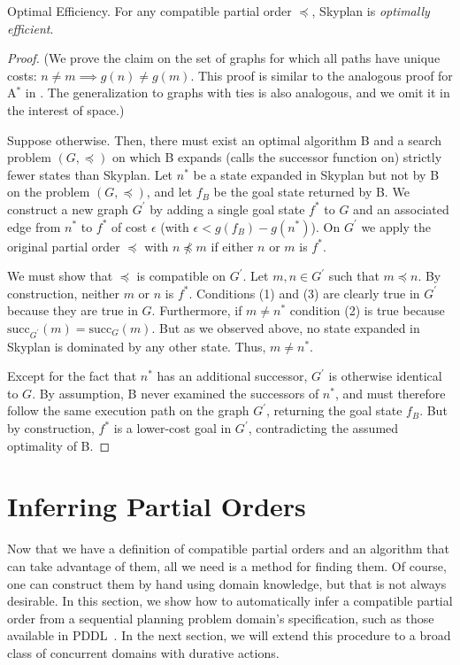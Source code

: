\documentclass[letterpaper]{article}
\theoremstyle{plain} \newtheorem{theorem}{Theorem} \newtheorem{proposition}{Proposition} \newtheorem{lemma}{Lemma}
\theoremstyle{definition} \newtheorem{definition}{Definition} \newtheorem{conjecture}{Conjecture} \newtheorem*{example}{Example}
\theoremstyle{remark} \newtheorem*{remark}{Remark} \newtheorem*{note}{Note} \newtheorem{case}{Case}
\newcommand{\Astar}{A$^*$ }
\begin{document}
\begin{claim}{Optimal Efficiency.}\label{clm-optimally-efficient}
For any compatible partial order $\preceq$, Skyplan is \emph{optimally efficient}.
\end{claim}
\begin{proof} 
(We prove the claim on the set of graphs for which all paths have unique costs: $n \neq m \implies g(n) \neq g(m)$. This proof
is similar to the analogous proof for \Astar in \citet{holte1996hierarchical}. The generalization to graphs with
ties is also analogous, and we omit it in the interest of space.)

Suppose otherwise. Then, there must exist an optimal algorithm B and a search problem $(G,\preceq)$ 
on which B expands (calls the successor function on) strictly fewer states than Skyplan. 
Let $n^{*}$ be a state expanded in Skyplan but not by B on the problem $(G,\preceq)$, and let
$f_{B}$ be the goal state returned by B. We construct a new graph $G^\prime$ by adding a single goal state $f^*$ to $G$ 
and an associated edge from $n^*$ to $f^*$ of cost $\epsilon$ (with $\epsilon < g(f_B)-g(n^*)$). 
On $G^\prime$ we apply the original partial order $\preceq$ with $n \npreceq m$ if either $n$ or $m$ is $f^*$.

We must show that $\preceq$ is compatible on $G^\prime$. 
Let $m,n \in G^\prime$ such that $m \preceq n$. By construction, neither $m$ or $n$ is $f^*$. Conditions (1) and (3) %
are clearly true in $G^\prime$ because they are true in $G$.  Furthermore, if $m \neq n^*$ condition (2) is true %
because $\mathrm{succ}_{G^\prime}(m) = \mathrm{succ}_{G}(m)$. 
But as we observed above, no state expanded in Skyplan is
dominated by any other state. Thus, $m \neq n^*$.

Except for the fact that $n^*$ has an additional successor, $G^\prime$ is otherwise
 identical to $G$. By assumption, B never examined the successors of $n^*$, and 
must therefore follow the same execution path on the graph $G^\prime$, returning the goal state $f_B$.
But by construction, $f^*$ is a lower-cost goal in $G^\prime$, contradicting the assumed optimality of B.
 \end{proof}


\section{Inferring Partial Orders}

\newcommand{\po}{\preceq_R}

Now that we have a definition of compatible partial orders and an
algorithm that can take advantage of them, all we need is a method
for finding them. Of course, one can construct them by hand using
domain knowledge, but that is not always desirable. In this section, we
show how to automatically infer a compatible partial order from a
sequential planning problem domain's specification, such as those
available in PDDL~\citep{ghallab1998pddl,fox2003pddl2}. In the next
section, we will extend this procedure to a broad class of concurrent
domains with durative actions.
\end{document}
